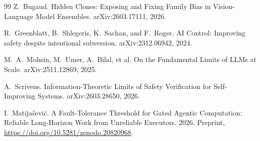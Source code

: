\documentclass[11pt]{article}
\theoremstyle{definition}
\theoremstyle{remark}
\begin{document}
\begin{thebibliography}{99}
 Z.~Bugaud. Hidden Clones: Exposing and Fixing Family Bias in
Vision-Language Model Ensembles. arXiv:2603.17111, 2026.

 R.~Greenblatt, B.~Shlegeris, K.~Sachan, and F.~Roger. AI Control: Improving
safety despite intentional subversion. arXiv:2312.06942, 2024.

 M.~A.~Mohsin, M.~Umer, A.~Bilal, et al. On the Fundamental Limits of LLMs
at Scale. arXiv:2511.12869, 2025.

 A.~Scrivens. Information-Theoretic Limits of Safety Verification for
Self-Improving Systems. arXiv:2603.28650, 2026.

 I.~Matijašević. A Fault-Tolerance Threshold for Gated Agentic Computation:
Reliable Long-Horizon Work from Unreliable Executors. 2026. Preprint,
\url{https://doi.org/10.5281/zenodo.20820968}.

\end{thebibliography}
\end{document}
